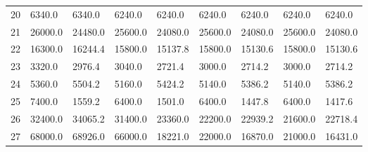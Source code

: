 \begin{tabular}{|r|l|l|l|l|l|l|l|l|}
  20 & 6340.0 & 6340.0 & 6240.0 & 6240.0 & 6240.0 & 6240.0 & 6240.0 & 6240.0 \\ 
  21 & 26000.0 & 24480.0 & 25600.0 & 24080.0 & 25600.0 & 24080.0 & 25600.0 & 24080.0 \\ 
  22 & 16300.0 & 16244.4 & 15800.0 & 15137.8 & 15800.0 & 15130.6 & 15800.0 & 15130.6 \\ 
  23 & 3320.0 & 2976.4 & 3040.0 & 2721.4 & 3000.0 & 2714.2 & 3000.0 & 2714.2 \\ 
  24 & 5360.0 & 5504.2 & 5160.0 & 5424.2 & 5140.0 & 5386.2 & 5140.0 & 5386.2 \\ 
  25 & 7400.0 & 1559.2 & 6400.0 & 1501.0 & 6400.0 & 1447.8 & 6400.0 & 1417.6 \\ 
  26 & 32400.0 & 34065.2 & 31400.0 & 23360.0 & 22200.0 & 22939.2 & 21600.0 & 22718.4 \\ 
  27 & 68000.0 & 68926.0 & 66000.0 & 18221.0 & 22000.0 & 16870.0 & 21000.0 & 16431.0 \\ 
\end{tabular}
